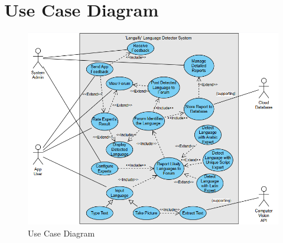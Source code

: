 \section{Use Case Diagram}
\label{sec:use_case_diagram}

\begin{figure}[H]
	\includegraphics[width=\linewidth]{Section3/UseCaseDiagram.png}
	\caption{Use Case Diagram}
	\label{UseCaseDiagram}
\end{figure}

%
%
%
